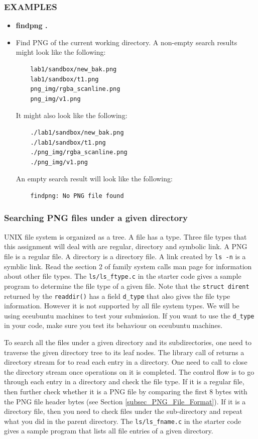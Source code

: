 \subsubsection*{EXAMPLES}
\begin{itemize}
	\item[]{\bf findpng .}
	\item[]Find PNG of the current working directory. A non-empty search results might look like the following:
	\begin{verbatim}
	lab1/sandbox/new_bak.png
	lab1/sandbox/t1.png
	png_img/rgba_scanline.png
	png_img/v1.png
	\end{verbatim}
    It might also look like the following:
	\begin{verbatim}
	./lab1/sandbox/new_bak.png
	./lab1/sandbox/t1.png
	./png_img/rgba_scanline.png
	./png_img/v1.png
	\end{verbatim}
	An empty search result will look like the following:
	\begin{verbatim}
	findpng: No PNG file found
	\end{verbatim}
\end{itemize}
\subsubsection{Searching PNG files under a given directory}
UNIX file system is organized as a tree. A file has a type. Three file types that this assignment will deal with are regular, directory and symbolic link.  A PNG file is a regular file. A directory is a directory file. A link created by \verb+ls -n+ is a symblic link. Read the section 2 of  family system calls man page for information about other file types. The \verb+ls/ls_ftype.c+ in the starter code gives a sample program to determine the file type of a given file. Note that the \verb+struct dirent+ returned by the \verb+readdir()+ has a field \verb+d_type+ that also gives the file type information. However it is not supported by all file system types. We will be using eceubuntu machines to test your submission. If you want to use the \verb+d_type+ in your code, make sure you test its behaviour on eceubuntu machines.

To search all the files under a given directory and its subdirectories, one need to traverse the given directory tree to its leaf nodes.  The library call of  returns a directory stream for  to read each entry in a directory. One need to call  to close the directory stream once operations on it is completed. The control flow is to go through each entry in a directory and check the file type. If it is a regular file, then further check whether it is a PNG file by comparing the first 8 bytes with the PNG file header bytes (see Section \ref{subsec_PNG_File_Format}). If it is a directory file, then you need to check files under the sub-directory and repeat what you did in the parent directory.
The \verb+ls/ls_fname.c+ in the starter code gives a sample program that lists all file entries of a given directory.

